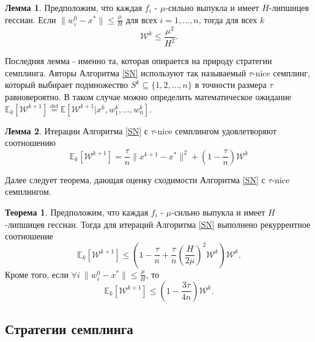 \documentclass{article}
\theoremstyle{definition}
\theoremstyle{assumption}
\theoremstyle{lemma}
\newtheorem{lemma}{Лемма}
\theoremstyle{theorem}
\newtheorem{theorem}{Теорема}
\theoremstyle{proposition}
\begin{document}
	\begin{lemma}\label{lemma:2}
		Предположим, что каждая $f_i$ - $\mu$-сильно выпукла и имеет $H$-липшицев гессиан. Если $\|w_i^0 - x^*\| \leqslant \frac{\mu}{H}$ для всех $i = 1, ..., n$, тогда для всех $k$
		\begin{equation}
			\mathcal W^k \leqslant \frac{\mu^2}{H^2}.
		\end{equation}
	\end{lemma}
	
	 Последняя лемма - именно та, которая опирается на природу стратегии семплинга. Авторы Алгоритма \ref{SN} используют так называемый $\tau$-nice семплинг, который выбирает подмножество $S^{k} \subseteq \{ 1, 2, ..., n \}$ в точности размера $\tau$ равновероятно. В таком случае можно определить математическое ожидание $\mathbb E_k[\mathcal W^{k+1}] \overset{\text{def}} = \mathbb E[\mathcal W^{k+1} | x^k, w_1^k, ..., w_n^k]$.
	
	\begin{lemma}\label{lemma:3}
		Итерации Алгоритма \ref{SN} с $\tau$-nice семплингом удовлетворяют соотношению
		\begin{equation}
			\mathbb E_k[\mathcal W^{k+1}] = \frac{\tau}{n} \| x^{k+1} - x^* \|^2 + \left(1 - \frac{\tau}{n}\right) \mathcal W^k
		\end{equation}
	\end{lemma}
	
	Далее следует теорема, дающая оценку сходимости Алгоритма \ref{SN} с $\tau$-nice семплингом.
	
	\begin{theorem} \label{theorem:1}
		Предположим, что каждая $f_i$ - $\mu$-сильно выпукла и имеет $H$-липшицев гессиан. Тогда для итераций Алгоритма \ref{SN} выполнено рекуррентное соотношение
		\begin{equation}
			\mathbb E_k[\mathcal W^{k+1}] \leqslant \left( 1 - \frac{\tau}{n} + \frac{\tau}{n} \left( \frac{H}{2\mu} \right)^2 \mathcal W^k \right) \mathcal W^k.
		\end{equation}
		Кроме того, если $\forall i\ \|w_i^0 - x^*\| \leqslant \frac{\mu}{H}$, то
		\begin{equation}
			\mathbb E_k[\mathcal W^{k+1}] \leqslant \left( 1 - \frac{3\tau}{4n} \right) \mathcal W^k.
		\end{equation}
	\end{theorem}
	
	
	\subsection{Стратегии семплинга}
	
\end{document}
